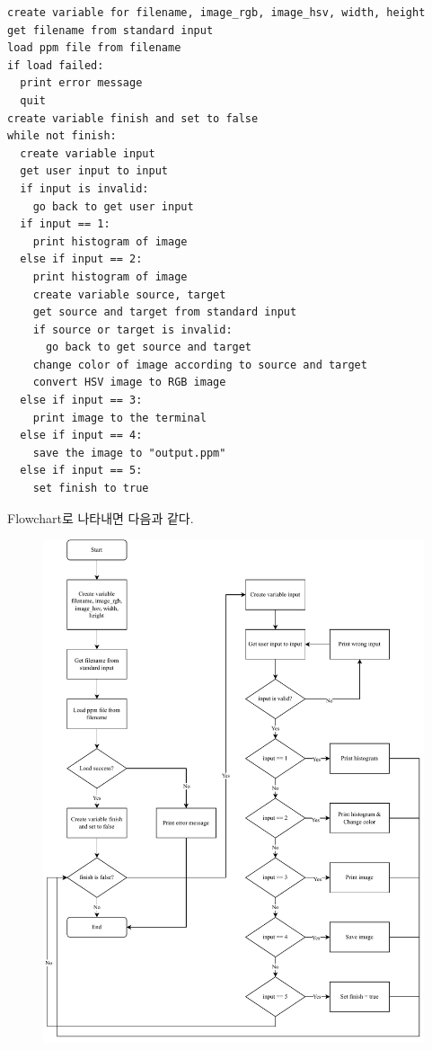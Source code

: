 \documentclass[titlepage]{article}
\begin{document}
\begin{lstlisting}
create variable for filename, image_rgb, image_hsv, width, height
get filename from standard input
load ppm file from filename
if load failed:
  print error message
  quit
create variable finish and set to false
while not finish:
  create variable input
  get user input to input
  if input is invalid:
    go back to get user input
  if input == 1:
    print histogram of image
  else if input == 2:
    print histogram of image
    create variable source, target
    get source and target from standard input
    if source or target is invalid:
      go back to get source and target
    change color of image according to source and target
    convert HSV image to RGB image
  else if input == 3:
    print image to the terminal
  else if input == 4:
    save the image to "output.ppm"
  else if input == 5:
    set finish to true
\end{lstlisting}

Flowchart로 나타내면 다음과 같다.

\begin{figure}[H]
  \centering
  \includegraphics[width=0.9\linewidth]{flowchart.drawio.pdf}
\end{figure}
\end{document}
